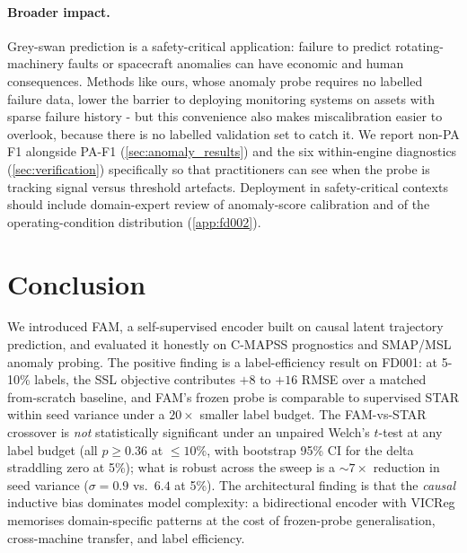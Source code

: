 \documentclass{article}
\begin{document}
\paragraph{Broader impact.}
Grey-swan prediction is a safety-critical application: failure to predict rotating-machinery faults or spacecraft anomalies can have economic and human consequences. Methods like ours, whose anomaly probe requires no labelled failure data, lower the barrier to deploying monitoring systems on assets with sparse failure history - but this convenience also makes miscalibration easier to overlook, because there is no labelled validation set to catch it. We report non-PA F1 alongside PA-F1 (\cref{sec:anomaly_results}) and the six within-engine diagnostics (\cref{sec:verification}) specifically so that practitioners can see when the probe is tracking signal versus threshold artefacts. Deployment in safety-critical contexts should include domain-expert review of anomaly-score calibration and of the operating-condition distribution (\cref{app:fd002}).

\section{Conclusion}
\label{sec:conclusion}

We introduced FAM, a self-supervised encoder built on causal latent trajectory prediction, and evaluated it honestly on C-MAPSS prognostics and SMAP/MSL anomaly probing. The positive finding is a label-efficiency result on FD001: at 5-10\% labels, the SSL objective contributes $+8$ to $+16$ RMSE over a matched from-scratch baseline, and FAM's frozen probe is comparable to supervised STAR within seed variance under a $20\times$ smaller label budget. The FAM-vs-STAR crossover is \emph{not} statistically significant under an unpaired Welch's $t$-test at any label budget (all $p \geq 0.36$ at $\leq 10\%$, with bootstrap 95\% CI for the delta straddling zero at 5\%); what is robust across the sweep is a $\sim 7\times$ reduction in seed variance ($\sigma = 0.9$ vs.\ $6.4$ at 5\%). The architectural finding is that the \emph{causal} inductive bias dominates model complexity: a bidirectional encoder with VICReg memorises domain-specific patterns at the cost of frozen-probe generalisation, cross-machine transfer, and label efficiency.
\end{document}
